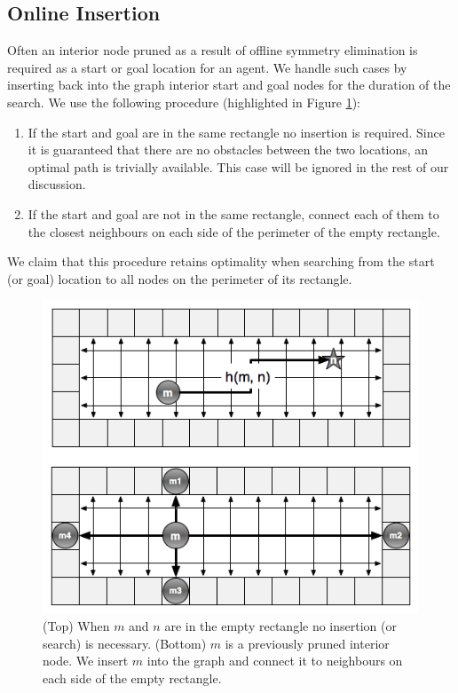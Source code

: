 \subsection{Online Insertion}
\label{cha::rsr::insertion}
Often an interior node pruned as a result of offline symmetry elimination
is required as a start or goal location for an agent.
We handle such cases by inserting back into the graph interior start and goal nodes  
for the duration of the search.
We use the following procedure (highlighted in Figure \ref{fig::rsr::insertion}):
\begin{enumerate}
\item{If the start and goal are in the same rectangle no insertion is required.
 Since it is guaranteed that there are no obstacles between the two locations, an optimal 
 path is trivially available. This case will be ignored in the rest of our discussion.}
\item{If the start and goal are not in the same rectangle, connect each of them
to the closest neighbours on each side of the perimeter of the empty rectangle.}
\end{enumerate}
We claim that this procedure retains optimality when searching from the start (or goal) location
to all nodes on the perimeter of its rectangle.

\begin{figure}[t]
	\vspace{-4pt}
       \begin{center}
           \includegraphics[scale=0.50, trim = 10mm 10mm 10mm 0mm]{chapter_rsr/diagrams/roomtraversal.png}
       \end{center}
	\vspace{-3pt}
\caption[Examples of online insertion]
{\small
(Top) When $m$ and $n$ are in the empty rectangle no insertion (or search) is necessary.
(Bottom) $m$ is a previously pruned interior node.
We insert $m$ into the graph and connect it to neighbours on each side of the empty rectangle.}
	\label{fig::rsr::insertion}
\end{figure}

